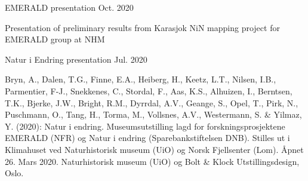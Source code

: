 
\begin{cventries}
    \cventry
  {} %
  {EMERALD presentation} %
  {} %
  {Oct. 2020} %
  {
    \begin{cvitems} %
      \item {Presentation of preliminary results from Karasjok NiN mapping project for EMERALD group at NHM}
    \end{cvitems}
  }
  \cventry
    {} %
    {Natur i Endring presentation} %
    {} %
    {Jul. 2020} %
    {
      \begin{cvitems} %
        \item {Bryn, A., Dalen, T.G., Finne, E.A., Heiberg, H., Keetz, L.T., Nilsen, I.B., Parmentier, F-J., Snekkenes, C., Stordal, F., Aas, K.S., Alhuizen, I., Berntsen, T.K., Bjerke, J.W., Bright, R.M., Dyrrdal, A.V., Geange, S., Opel, T., Pirk, N., Puschmann, O., Tang, H., Torma, M., Vollsnes, A.V., Westermann, S. \& Yilmaz, Y. (2020): Natur i endring. Museumsutstilling lagd for forskningsprosjektene EMERALD (NFR) og Natur i endring (Sparebankstiftelsen DNB). Stilles ut i Klimahuset ved Naturhistorisk museum (UiO) og Norsk Fjellsenter (Lom). Åpnet 26. Mars 2020. Naturhistorisk museum (UiO) og Bolt \& Klock Utstillingsdesign, Oslo.}
      \end{cvitems}
    }

\end{cventries}
